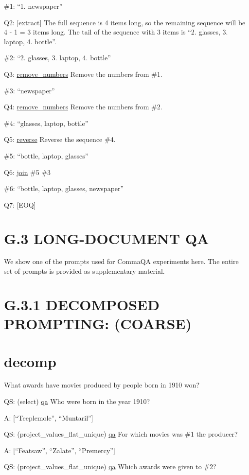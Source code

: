 \documentclass[
]{article}
\begin{document}
\#1: ``1. newspaper''

Q2: {[}extract{]} The full sequence is 4 items long, so the remaining
sequence will be 4 - 1 = 3 items long. The tail of the sequence with 3
items is ``2. glasses, 3. laptop, 4. bottle''.

\#2: ``2. glasses, 3. laptop, 4. bottle''

Q3: \hyperref[remove_numbers]{remove\_numbers} Remove the numbers from
\#1.

\#3: ``newspaper''

Q4: \hyperref[remove_numbers]{remove\_numbers} Remove the numbers from
\#2.

\#4: ``glasses, laptop, bottle''

Q5: \hyperref[reverse]{reverse} Reverse the sequence \#4.

\#5: ``bottle, laptop, glasses''

Q6: \hyperref[join]{join} \#5 \#3

\#6: ``bottle, laptop, glasses, newspaper''

Q7: {[}EOQ{]}

\section{G.3 LONG-DOCUMENT QA}\label{g.3-long-document-qa}

We show one of the prompts used for CommaQA experiments here. The entire
set of prompts is provided as supplementary material.

\section{G.3.1 DECOMPOSED PROMPTING:
(COARSE)}\label{g.3.1-decomposed-prompting-coarse}

\section{decomp}\label{decomp-2}

What awards have movies produced by people born in 1910 won?

QS: (select) \hyperref[qa]{qa} Who were born in the year 1910?

A: {[}``Teeplemole'', ``Muntaril''{]}

QS: (project\_values\_flat\_unique) \hyperref[qa]{qa} For which movies
was \#1 the producer?

A: {[}``Featsaw'', ``Zalate'', ``Premercy''{]}

QS: (project\_values\_flat\_unique) \hyperref[qa]{qa} Which awards were
given to \#2?
\end{document}

